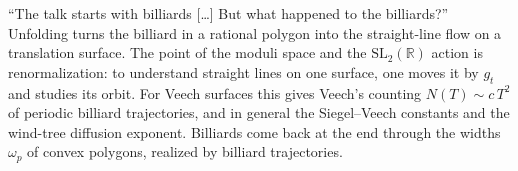 ``The talk starts with billiards [\ldots] But
what happened to the billiards?'' Unfolding
turns the billiard in a rational polygon into
the straight-line flow on a translation
surface. The point of the moduli space and
the $\mathrm{SL}_2(\mathbb{R})$ action is
renormalization: to understand straight lines
on one surface, one moves it by $g_t$ and
studies its orbit. For Veech surfaces this
gives Veech's counting $N(T)\sim c\,T^2$ of
periodic billiard trajectories, and in
general the Siegel--Veech constants and the
wind-tree diffusion exponent. Billiards come
back at the end through the widths $\omega_p$
of convex polygons, realized by billiard
trajectories.








